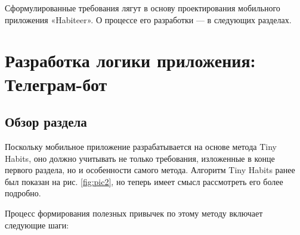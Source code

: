 \documentclass[pdflatex,sn-mathphys-num]{sn-jnl}%
\theoremstyle{thmstyleone}%
\theoremstyle{thmstyletwo}%
\theoremstyle{thmstylethree}%
\begin{document}
Сформулированные требования лягут в основу проектирования мобильного приложения «Habiteer». О процессе его разработки — в следующих разделах.

\newpage

\section{Разработка логики приложения: Телеграм-бот}\label{Development}

\subsection{Обзор раздела}

Поскольку мобильное приложение разрабатывается на основе метода Tiny Habits, оно должно учитывать не только требования, изложенные в конце первого раздела, но и особенности самого метода. Алгоритм Tiny Habits ранее был показан на рис. \ref{fig:pic2}, но теперь имеет смысл рассмотреть его более подробно.

Процесс формирования полезных привычек по этому методу включает следующие шаги:
\end{document}

